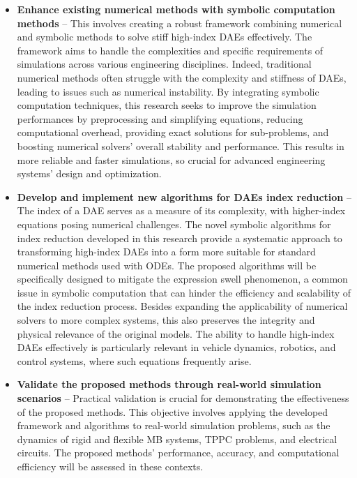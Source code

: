 \begin{itemize}
  \setlength\itemsep{0em}
  \item \textbf{Enhance existing numerical methods with symbolic computation methods} -- This involves creating a robust framework combining numerical and symbolic methods to solve stiff high-index \acp{DAE} effectively. The framework aims to handle the complexities and specific requirements of simulations across various engineering disciplines. Indeed, traditional numerical methods often struggle with the complexity and stiffness of \acp{DAE}, leading to issues such as numerical instability. By integrating symbolic computation techniques, this research seeks to improve the simulation performances by preprocessing and simplifying equations, reducing computational overhead, providing exact solutions for sub-problems, and boosting numerical solvers' overall stability and performance. This results in more reliable and faster simulations, so crucial for advanced engineering systems' design and optimization.
  \item \textbf{Develop and implement new algorithms for \acp{DAE} index reduction} -- The index of a \ac{DAE} serves as a measure of its complexity, with higher-index equations posing numerical challenges. The novel symbolic algorithms for index reduction developed in this research provide a systematic approach to transforming high-index \acp{DAE} into a form more suitable for standard numerical methods used with \acp{ODE}. The proposed algorithms will be specifically designed to mitigate the expression swell phenomenon, a common issue in symbolic computation that can hinder the efficiency and scalability of the index reduction process. Besides expanding the applicability of numerical solvers to more complex systems, this also preserves the integrity and physical relevance of the original models. The ability to handle high-index \acp{DAE} effectively is particularly relevant in vehicle dynamics, robotics, and control systems, where such equations frequently arise.
  \item \textbf{Validate the proposed methods through real-world simulation scenarios} -- Practical validation is crucial for demonstrating the effectiveness of the proposed methods. This objective involves applying the developed framework and algorithms to real-world simulation problems, such as the dynamics of rigid and flexible \ac{MB} systems, \ac{TPPC} problems, and electrical circuits. The proposed methods' performance, accuracy, and computational efficiency will be assessed in these contexts.

\end{itemize}
